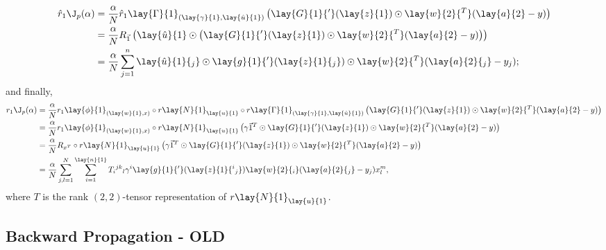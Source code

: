 \begin{align*}
	\hat{r}_1\J_p(\alpha)&=\frac{\alpha}{N}\hat{r}_1\lay{\Gamma}{1}_{(\lay{\gamma}{1},\lay{\hat{u}}{1})}\left(\lay{G}{1}{'}(\lay{z}{1})\odot\lay{w}{2}{^T}(\lay{a}{2}-y)\right)\\
	&=\frac{\alpha}{N}R_{\vec{1}}\left(\lay{\hat{u}}{1}\odot \left(\lay{G}{1}{'}(\lay{z}{1})\odot\lay{w}{2}{^T}(\lay{a}{2}-y)\right) \right)\\
	&=\frac{\alpha}{N}\sum_{j=1}^n\lay{\hat{u}}{1}{_j}\odot\lay{g}{1}{'}(\lay{z}{1}{_j})\odot\lay{w}{2}{^T}(\lay{a}{2}{_j}-y_j); 
\end{align*}
and finally,
\begin{align*}
	r_1\J_p(\alpha)&=\frac{\alpha}{N}r_1\lay{\phi}{1}_{(\lay{w}{1},x)}\circ r\lay{N}{1}_{\lay{u}{1}}\circ r\lay{\Gamma}{1}_{(\lay{\gamma}{1},\lay{\hat{u}}{1})}\left(\lay{G}{1}{'}(\lay{z}{1})\odot\lay{w}{2}{^T}(\lay{a}{2}-y)\right)\\
	&=\frac{\alpha}{N}r_1\lay{\phi}{1}_{(\lay{w}{1},x)}\circ r\lay{N}{1}_{\lay{u}{1}}\left(\gamma\vec{1}^T\odot\lay{G}{1}{'}(\lay{z}{1})\odot\lay{w}{2}{^T}(\lay{a}{2}-y)\right)\\
	&=\frac{\alpha}{N}R_{x^T}\circ r\lay{N}{1}_{\lay{u}{1}}\left(\gamma\vec{1}^T\odot\lay{G}{1}{'}(\lay{z}{1})\odot\lay{w}{2}{^T}(\lay{a}{2}-y)\right)\\
	&=\frac{\alpha}{N}\sum_{j,l=1}^N\sum_{i=1}^{\lay{n}{1}}T_i{^{jk}}{_l}\gamma^i\lay{g}{1}{'}(\lay{z}{1}{^i{_j}})\lay{w}{2}{_i}(\lay{a}{2}{_j}-y_j)x^m_l,
\end{align*}
where $T$ is the rank $(2,2)$-tensor representation of $r\lay{N}{1}_{\lay{u}{1}}$.








\subsection{Backward Propagation - OLD}

